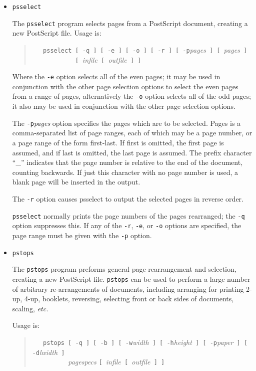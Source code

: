 \documentclass[twoside,11pt]{starlink}
\begin{document}
\begin{itemize}
\item \texttt{psselect}

The \texttt{psselect} program selects pages from a PostScript document,
creating a new PostScript file. Usage is:

\begin{quote}
\verb+   psselect [ -q ] [ -e ] [ -o ] [ -r ] [ -p+\emph{pages}\verb+ ] [ +\emph{pages}\verb+ ]+\\
\verb+            [ +\emph{infile}\verb+ [ +\emph{outfile}\verb+ ] ]+
\end{quote}

Where the \texttt{-e} option selects all of the even pages; it may be
used in conjunction with the other page selection options to select
the even pages from a range of pages, alternatively the \texttt{-o}
option selects all of the odd pages; it also may be used in
conjunction with the other page selection options.

The \texttt{-p}\emph{pages} option specifies the pages which are to be
selected. Pages is a comma-separated list of page ranges, each of
which may be a page number, or a page range of the form first-last. If
first is omitted, the first page is assumed, and if last is omitted,
the last page is assumed. The prefix character ``\_'' indicates that
the page number is relative to the end of the document, counting
backwards. If just this character with no page number is used, a blank
page will be inserted in the output.

The \texttt{-r} option causes psselect to output the selected pages in reverse order.

\texttt{psselect} normally prints the page numbers of the pages
rearranged; the \texttt{-q} option suppresses this.  If any of the \texttt{-r}, \texttt{-e}, or \texttt{-o} options are specified, the page range must
be given with the \texttt{-p} option.

\item \texttt{pstops}

The \texttt{pstops} program preforms general page rearrangement and
selection, creating a new PostScript file. \texttt{pstops} can be used to
perform a large number of arbitrary re-arrangements of documents,
including arranging for printing 2-up, 4-up, booklets, reversing,
selecting front or back sides of documents, scaling, \emph{etc.\ }

Usage is:

\begin{quote}
\verb+   pstops [ -q ] [ -b ] [ -w+\emph{width}\verb+ ] [ -h+\emph{height}\verb+ ] [ -p+\emph{paper}\verb+ ] [ -d+\emph{lwidth}\verb+ ] +\\
\verb+          +\emph{pagespecs} \verb+[ +\emph{infile}\verb+ [ +\emph{outfile}\verb+ ] ]+
\end{quote}


\end{itemize}
\end{document}
